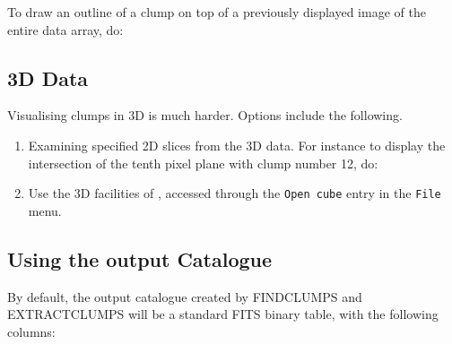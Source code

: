 \documentclass[twoside,11pt]{starlink}
\begin{document}
To draw an outline of a clump on top of a previously displayed image of
the entire data array, do:

\small
\begin{terminalv}
\end{terminalv}
\normalsize

\subsection{3D Data}

Visualising clumps in 3D is much harder. Options include the following.

\begin{enumerate}

\item Examining specified 2D slices from the 3D data. For instance to
display the intersection of the tenth pixel plane with clump number 12, do:

\small
\begin{terminalv}
\end{terminalv}
\normalsize

\item Use the 3D facilities of  ,
accessed through the \verb+Open cube+ entry in the \verb+File+ menu.

\end{enumerate}


\subsection{Using the output Catalogue}
By default, the output catalogue created by FINDCLUMPS and EXTRACTCLUMPS
will be a standard FITS binary table, with the following columns:
\end{document}
